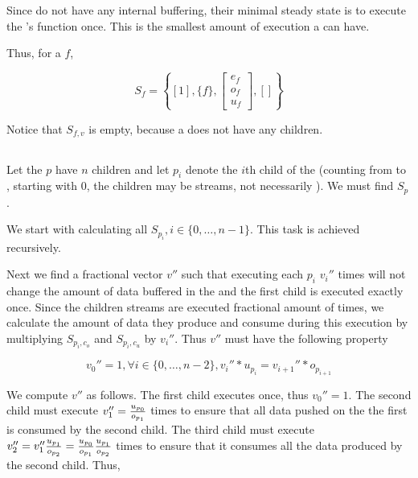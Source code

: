 Since {\filters} do not have any internal buffering, their minimal
steady state is to execute the {\filter}'s {\work} function once.
This is the smallest amount of execution a {\filter} can have.

Thus, for a {\filter} $f$,

\begin{displaymath}
S_f = \left\{[1], \{f\}, { \left[
\begin{array}{c}e_f\\o_f\\u_f
\end{array}
\right]}, [] \right\}
\end{displaymath}

Notice that $S_{f,v}$ is empty, because a {\filter} does not have
any children.

\subsection{\pipeline}

Let the {\pipeline} $p$ have $n$ children and let $p_i$ denote the
$i$th child of the {\pipeline} (counting from {\Input} to
{\Output}, starting with 0, the children may be streams, not
necessarily {\filters}). We must find $S_p$.

We start with calculating all $S_{p_i}, i \in \{0, \dots, n-1\}$.
This task is achieved recursively.

Next we find a fractional vector $v''$ such that executing each
$p_i$ $v_i''$ times will not change the amount of data buffered in
the {\pipeline} and the first child is executed exactly once.
Since the children streams are executed fractional amount of
times, we calculate the amount of data they produce and consume
during this execution by multiplying $S_{p_i,c_o}$ and
$S_{p_i,c_u}$ by $v_i''$. Thus $v''$ must have the following
property

\begin{displaymath}
v_0'' = 1, \forall i \in \{0,\dots,n-2\}, v_i'' * u_{p_i} =
v_{i+1}'' * o_{p_{i+1}}
\end{displaymath}

We compute $v''$ as follows.  The first child executes once, thus
$v_0'' = 1$.  The second child must execute $v_1'' = {u_{p_0}
\over {o_{p_1}}}$ times to ensure that all data pushed on the the
first {{\Channel}} is consumed by the second child.  The third
child must execute $v_2'' = v_1'' {u_{p_1} \over o_{p_2}} =
{u_{p_0} \over o_{p_1}} {u_{p_1} \over o_{p_2}}$ times to ensure
that it consumes all the data produced by the second child. Thus,


